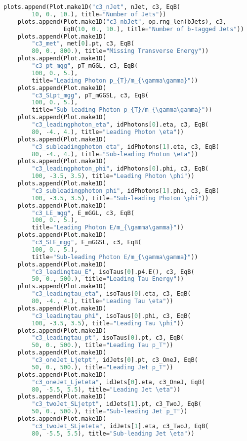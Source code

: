 \begin{lstlisting}[language=Python, caption=Python module of the analysis used in Bamboo framework, label={bamboocode}]
    plots.append(Plot.make1D("c3_nJet", nJet, c3, EqB(
        10, 0., 10.), title="Number of Jets"))
    plots.append(Plot.make1D("c3_nbJet", op.rng_len(bJets), c3,
                 EqB(10, 0., 10.), title="Number of b-tagged Jets"))
    plots.append(Plot.make1D(
        "c3_met", met[0].pt, c3, EqB(
        80, 0., 800.), title="Missing Transverse Energy"))
    plots.append(Plot.make1D(
        "c3_pt_mgg", pT_mGGL, c3, EqB(
        100, 0., 5.),
        title="Leading Photon p_{T}/m_{\gamma\gamma}"))
    plots.append(Plot.make1D(
        "c3_SLpt_mgg", pT_mGGSL, c3, EqB(
        100, 0., 5.),
        title="Sub-leading Photon p_{T}/m_{\gamma\gamma}"))
    plots.append(Plot.make1D(
        "c3_leadingphoton_eta", idPhotons[0].eta, c3, EqB(
        80, -4., 4.), title="Leading Photon \eta"))
    plots.append(Plot.make1D(
        "c3_subleadingphoton_eta", idPhotons[1].eta, c3, EqB(
        80, -4., 4.), title="Sub-leading Photon \eta"))
    plots.append(Plot.make1D(
        "c3_leadingphoton_phi", idPhotons[0].phi, c3, EqB(
        100, -3.5, 3.5), title="Leading Photon \phi"))
    plots.append(Plot.make1D(
        "c3_subleadingphoton_phi", idPhotons[1].phi, c3, EqB(
        100, -3.5, 3.5), title="Sub-leading Photon \phi"))
    plots.append(Plot.make1D(
        "c3_LE_mgg", E_mGGL, c3, EqB(
        100, 0., 5.),
        title="Leading Photon E/m_{\gamma\gamma}"))
    plots.append(Plot.make1D(
        "c3_SLE_mgg", E_mGGSL, c3, EqB(
        100, 0., 5.),
        title="Sub-leading Photon E/m_{\gamma\gamma}"))
    plots.append(Plot.make1D(
        "c3_leadingtau_E", isoTaus[0].p4.E(), c3, EqB(
        50, 0., 500.), title="Leading Tau Energy"))
    plots.append(Plot.make1D(
        "c3_leadingtau_eta", isoTaus[0].eta, c3, EqB(
        80, -4., 4.), title="Leading Tau \eta"))
    plots.append(Plot.make1D(
        "c3_leadingtau_phi", isoTaus[0].phi, c3, EqB(
        100, -3.5, 3.5), title="Leading Tau \phi"))
    plots.append(Plot.make1D(
        "c3_leadingtau_pt", isoTaus[0].pt, c3, EqB(
        50, 0., 500.), title="Leading Tau p_T"))
    plots.append(Plot.make1D(
        "c3_oneJet_Ljetpt", idJets[0].pt, c3_OneJ, EqB(
        50, 0., 500.), title="Leading Jet p_T"))
    plots.append(Plot.make1D(
        "c3_oneJet_Ljeteta", idJets[0].eta, c3_OneJ, EqB(
        80, -5.5, 5.5), title="Leading Jet \eta"))
    plots.append(Plot.make1D(
        "c3_twoJet_SLjetpt", idJets[1].pt, c3_TwoJ, EqB(
        50, 0., 500.), title="Sub-leading Jet p_T"))
    plots.append(Plot.make1D(
        "c3_twoJet_SLjeteta", idJets[1].eta, c3_TwoJ, EqB(
        80, -5.5, 5.5), title="Sub-leading Jet \eta"))


\end{lstlisting}
